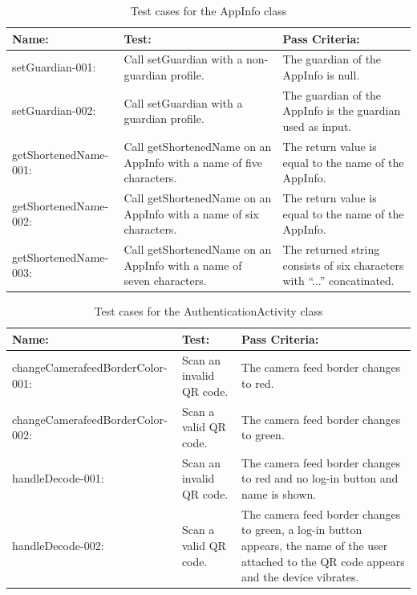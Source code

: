 \begin{table}[ht]
\caption{Test cases for the AppInfo class} %
\centering  %
\begin{tabular}{| p{1.7in} | p{1.7in} | p{1.7in} |}
\hline
Name: & Test: & Pass Criteria: \\ [0.5ex] %
\hline    
setGuardian-001: & Call setGuardian with a non-guardian profile. & The guardian of the AppInfo is null. \\ \hline 
setGuardian-002: & Call setGuardian with a guardian profile. & The guardian of the AppInfo is the guardian used as input. \\ \hline
getShortenedName-001: & Call getShortenedName on an AppInfo with a name of five characters. & The return value is equal to the name of the AppInfo. \\ \hline 
getShortenedName-002: & Call getShortenedName on an AppInfo with a name of six characters. & The return value is equal to the name of the AppInfo. \\ \hline 
getShortenedName-003: & Call getShortenedName on an AppInfo with a name of seven characters. & The returned string consists of six characters with "`..."' concatinated. \\ [1ex] 
\hline %
\end{tabular}
\label{table:appinfo_tests} %
\end{table}

\begin{table}[ht]
\caption{Test cases for the AuthenticationActivity class} %
\centering  %
\begin{tabular}{| p{1.7in} | p{1.7in} | p{1.7in} |}
\hline
Name: & Test: & Pass Criteria: \\ [0.5ex] %
\hline    
changeCamerafeed\newline{}BorderColor-001: & Scan an invalid QR code. & The camera feed border changes to red. \\ \hline 
changeCamerafeed\newline{}BorderColor-002: & Scan a valid QR code. & The camera feed border changes to green. \\ \hline
handleDecode-001: & Scan an invalid QR code. & The camera feed border changes to red and no log-in button and name is shown. \\ \hline 
handleDecode-002: & Scan a valid QR code. & The camera feed border changes to green, a log-in button appears, the name of the user attached to the QR code appears and the device vibrates. \\ [1ex] 
\hline %
\end{tabular}
\label{table:authenticationactivity_tests} %
\end{table}

